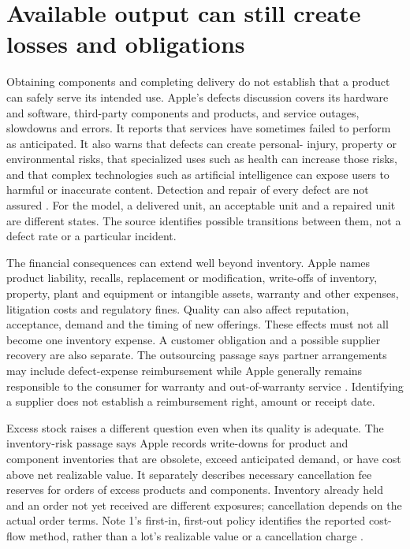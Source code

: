 \section{Available output can still create losses and obligations}
\label{sec:apple-quality-inventory}

Obtaining components and completing delivery do not establish that a product
can safely serve its intended use. Apple's defects discussion covers its
hardware and software, third-party components and products, and service
outages, slowdowns and errors. It reports that services have sometimes failed
to perform as anticipated. It also warns that defects can create personal-
injury, property or environmental risks, that specialized uses such as health
can increase those risks, and that complex technologies such as artificial
intelligence can expose users to harmful or inaccurate content. Detection and
repair of every defect are not assured \citep[Risk Factors, printed p.~9]{apple2024}.
For the model, a delivered unit, an acceptable unit and a repaired unit are
different states. The source identifies possible transitions between them,
not a defect rate or a particular incident.

The financial consequences can extend well beyond inventory. Apple names
product liability, recalls, replacement or modification, write-offs of
inventory, property, plant and equipment or intangible assets, warranty and
other expenses, litigation costs and regulatory fines. Quality can also affect
reputation, acceptance, demand and the timing of new offerings. These effects
must not all become one inventory expense. A customer obligation and a possible
supplier recovery are also separate. The outsourcing passage says partner
arrangements may include defect-expense reimbursement while Apple generally
remains responsible to the consumer for warranty and out-of-warranty service
\citep[Risk Factors, printed p.~8]{apple2024}. Identifying a supplier does not
establish a reimbursement right, amount or receipt date.

Excess stock raises a different question even when its quality is adequate.
The inventory-risk passage says Apple records write-downs for product and
component inventories that are obsolete, exceed anticipated demand, or have
cost above net realizable value. It separately describes necessary cancellation
fee reserves for orders of excess products and components. Inventory already
held and an order not yet received are different exposures; cancellation
depends on the actual order terms. Note 1's first-in, first-out policy identifies
the reported cost-flow method, rather than a lot's realizable value or a
cancellation charge \citep[Risk Factors, printed p.~9; Note 1, printed p.~34]{apple2024}.

